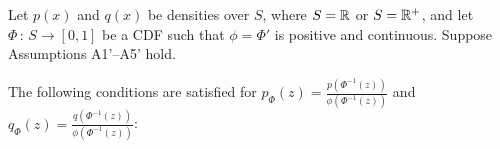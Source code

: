 \documentclass{article}
\begin{document}
\begin{proposition}
\label{prop:transformation1}
Let $p(x)$ and $q(x)$ be densities over $S$, where $S = {\mathbb R}$ or $S = {\mathbb R}^+$, and let $\Phi \,:\, S \rightarrow [0,1]$ be a CDF such that $\phi = \Phi'$ is positive and continuous. Suppose Assumptions A1'--A5' hold.





The following conditions are satisfied for $p_\Phi(z) = \frac{p(\Phi^{-1}(z))}{\phi(\Phi^{-1}(z))}$ and $q_\Phi(z) = \frac{q(\Phi^{-1}(z))}{\phi(\Phi^{-1}(z))}$:


\end{proposition}
\end{document}
